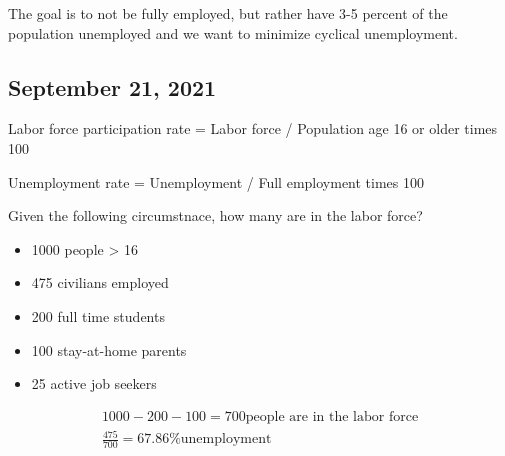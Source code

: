 \documentclass{scrreprt} %
\begin{document}
\begin{remark}
	The goal is to not be fully employed, but rather have 3-5 percent of the population
	unemployed and we want to minimize cyclical unemployment.
\end{remark}

\subsection{September 21, 2021}

\begin{definition}
	Labor force participation rate = Labor force / Population age 16 or older times 100

	Unemployment rate = Unemployment / Full employment times 100
\end{definition}

\begin{example}
	Given the following circumstnace, how many are in the labor force?

	\begin{itemize}
		\item 1000 people > 16
		\item 475 civilians employed
		\item 200 full time students
		\item 100 stay-at-home parents
		\item 25 active job seekers
	\end{itemize}

	\begin{align*}
		1000 - 200 - 100 = 700 \text{people are in the labor force} \\
		\frac{475}{700} = 67.86 \text{\% unemployment} \\

	\end{align*}
\end{example}
\end{document}
